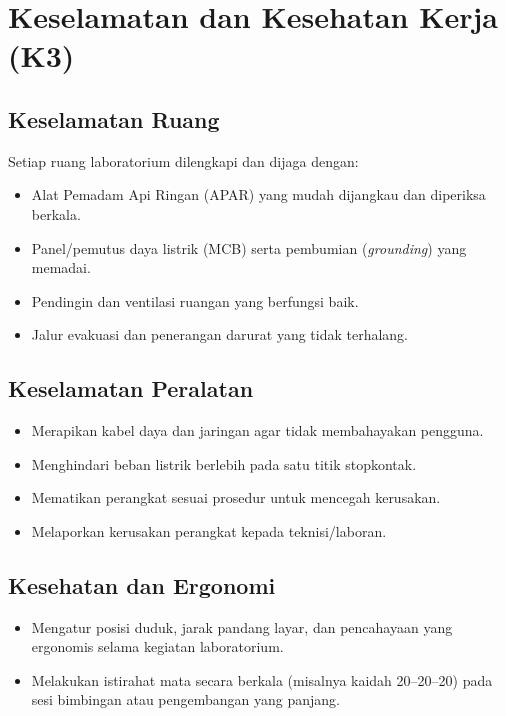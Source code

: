 \documentclass[12pt,a4paper]{report}
\begin{document}
\chapter{Keselamatan dan Kesehatan Kerja (K3)}

\section{Keselamatan Ruang}
Setiap ruang laboratorium dilengkapi dan dijaga dengan:
\begin{itemize}
\item Alat Pemadam Api Ringan (APAR) yang mudah dijangkau dan diperiksa berkala.
\item Panel/pemutus daya listrik (MCB) serta pembumian (\emph{grounding}) yang memadai.
\item Pendingin dan ventilasi ruangan yang berfungsi baik.
\item Jalur evakuasi dan penerangan darurat yang tidak terhalang.
\end{itemize}

\section{Keselamatan Peralatan}
\begin{itemize}
\item Merapikan kabel daya dan jaringan agar tidak membahayakan pengguna.
\item Menghindari beban listrik berlebih pada satu titik stopkontak.
\item Mematikan perangkat sesuai prosedur untuk mencegah kerusakan.
\item Melaporkan kerusakan perangkat kepada teknisi/laboran.
\end{itemize}

\section{Kesehatan dan Ergonomi}
\begin{itemize}
\item Mengatur posisi duduk, jarak pandang layar, dan pencahayaan yang ergonomis selama kegiatan laboratorium.
\item Melakukan istirahat mata secara berkala (misalnya kaidah 20--20--20) pada sesi bimbingan atau pengembangan yang panjang.
\end{itemize}
\end{document}
